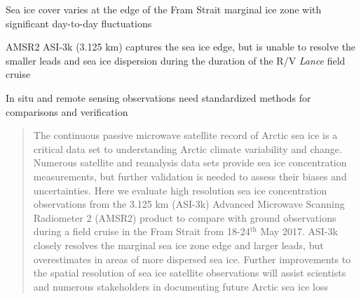 \documentclass[draft,linenumbers]{agujournal}
\begin{document}





\begin{keypoints}
\item Sea ice cover varies at the edge of the Fram Strait marginal ice zone with significant day-to-day fluctuations
\item AMSR2 ASI-3k (3.125 km) captures the sea ice edge, but is unable to resolve the smaller leads and sea ice dispersion during the duration of the R/V \textit{Lance} field cruise 
\item In situ and remote sensing observations need standardized methods for comparisons and verification
\end{keypoints}

%
%


\begin{abstract}
The continuous passive microwave satellite record of Arctic sea ice is a critical data set to understanding Arctic climate variability and change. Numerous satellite and reanalysis data sets provide sea ice concentration measurements, but further validation is needed to assess their biases and uncertainties. Here we evaluate high resolution sea ice concentration observations from the 3.125 km (ASI-3k) Advanced Microwave Scanning Radiometer 2 (AMSR2) product to compare with ground observations during a field cruise in the Fram Strait from 18-24$^{\text{th}}$ May 2017. ASI-3k closely resolves the marginal sea ice zone edge and larger leads, but overestimates in areas of more dispersed sea ice. Further improvements to the spatial resolution of sea ice satellite observations will assist scientists and numerous stakeholders in documenting future Arctic sea ice loss
\end{abstract}
\end{document}
